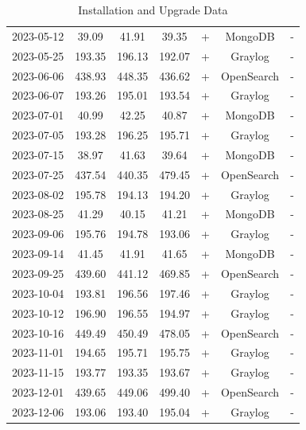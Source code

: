 \documentclass[../main.tex]{subfiles}
\begin{document}
\begin{table}[H]
\begin{tabular}{|c|c|c|c|c|c|c|}
        2023-05-12 & 39.09 & 41.91 & 39.35 & + & MongoDB & - \\
        2023-05-25 & 193.35 & 196.13 & 192.07 & + & Graylog & - \\
        2023-06-06 & 438.93 & 448.35 & 436.62 & + & OpenSearch & - \\
        2023-06-07 & 193.26 & 195.01 & 193.54 & + & Graylog & - \\
        2023-07-01 & 40.99 & 42.25 & 40.87 & + & MongoDB & - \\
        2023-07-05 & 193.28 & 196.25 & 195.71 & + & Graylog & - \\
        2023-07-15 & 38.97 & 41.63 & 39.64 & + & MongoDB & - \\
        2023-07-25 & 437.54 & 440.35 & 479.45 & + & OpenSearch & - \\
        2023-08-02 & 195.78 & 194.13 & 194.20 & + & Graylog & - \\
        2023-08-25 & 41.29 & 40.15 & 41.21 & + & MongoDB & - \\
        2023-09-06 & 195.76 & 194.78 & 193.06 & + & Graylog & - \\
        2023-09-14 & 41.45 & 41.91 & 41.65 & + & MongoDB & - \\
        2023-09-25 & 439.60 & 441.12 & 469.85 & + & OpenSearch & - \\
        2023-10-04 & 193.81 & 196.56 & 197.46 & + & Graylog & - \\
        2023-10-12 & 196.90 & 196.55 & 194.97 & + & Graylog & - \\
        2023-10-16 & 449.49 & 450.49 & 478.05 & + & OpenSearch & - \\
        2023-11-01 & 194.65 & 195.71 & 195.75 & + & Graylog & - \\
        2023-11-15 & 193.77 & 193.35 & 193.67 & + & Graylog & - \\
        2023-12-01 & 439.65 & 449.06 & 499.40 & + & OpenSearch & - \\
        2023-12-06 & 193.06 & 193.40 & 195.04 & + & Graylog & - \\
        \hline
    \end{tabular}
    \caption{Installation and Upgrade Data}
    \label{tab:graylog_results_2023}
\end{table}
\end{document}

